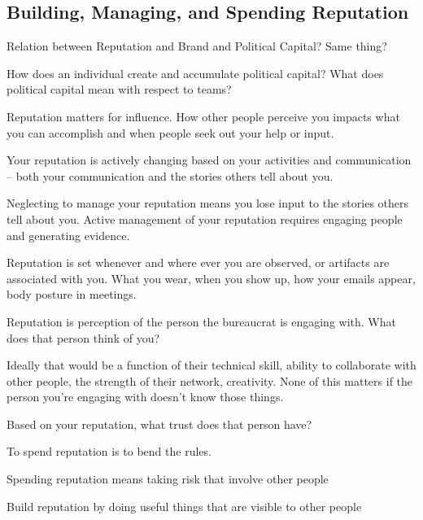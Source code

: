 \subsection{Building, Managing, and Spending Reputation\label{sec:reputation}}

Relation between Reputation and Brand and Political Capital? Same thing?


How does an individual create and accumulate political capital? What does political capital mean with respect to teams?


Reputation matters for influence. How other people perceive you impacts what you can accomplish and when people seek out your help or input.

Your reputation is actively changing based on your activities and communication -- both your communication and the stories others tell about you.

Neglecting to manage your reputation means you lose input to the stories others tell about you. Active management of your reputation requires engaging people and generating evidence. 

Reputation is set whenever and where ever you are observed, or artifacts are associated with you. What you wear, when you show up, how your emails appear, body posture in meetings. 


Reputation is perception of the person the bureaucrat is engaging with.  What does that person think of you?

Ideally that would be a function of their technical skill, ability to collaborate with other people, the strength of their network, creativity. None of this matters if the person you're engaging with doesn't know those things. 

Based on your reputation, what trust does that person have? 

To spend reputation is to bend the rules. 

Spending reputation means taking risk that involve other people

Build reputation by doing useful things that are visible to other people

